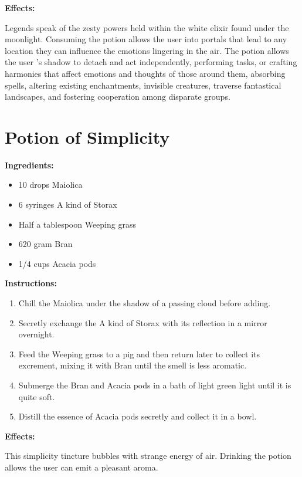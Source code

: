 \documentclass{article}
\begin{document}
\textbf{Effects:}

Legends speak of the zesty powers held within the white elixir found under the moonlight. Consuming the potion allows the user into portals that lead to any location they can influence the emotions lingering in the air. The potion allows the user 's shadow to detach and act independently, performing tasks, or crafting harmonies that affect emotions and thoughts of those around them, absorbing spells, altering existing enchantments, invisible creatures, traverse fantastical landscapes, and fostering cooperation among disparate groups.

\newpage
\section*{Potion of Simplicity}

\textbf{Ingredients:}

\begin{itemize}
  \item 10 drops Maiolica
  \item 6 syringes A kind of Storax
  \item Half a tablespoon Weeping grass
  \item 620 gram Bran
  \item 1/4 cups Acacia pods
\end{itemize}

\textbf{Instructions:}

\begin{enumerate}
  \item Chill the Maiolica under the shadow of a passing cloud before adding.
  \item Secretly exchange the A kind of Storax with its reflection in a mirror overnight.
  \item Feed the Weeping grass to a pig and then return later to collect its excrement, mixing it with Bran until the smell is less aromatic.
  \item Submerge the Bran and Acacia pods in a bath of light green light until it is quite soft.
  \item Distill the essence of Acacia pods secretly and collect it in a bowl.
\end{enumerate}

\textbf{Effects:}

This simplicity tincture bubbles with strange energy of air. Drinking the potion allows the user can emit a pleasant aroma.
\end{document}
